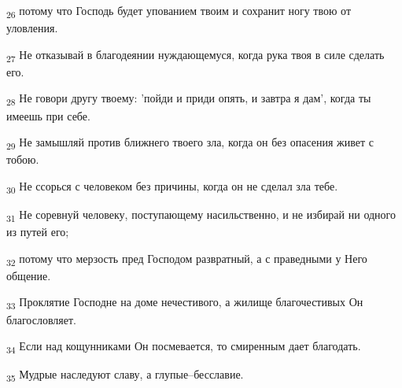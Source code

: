 \begin{tcolorbox}
\textsubscript{26} потому что Господь будет упованием твоим и сохранит ногу твою от уловления.
\end{tcolorbox}
\begin{tcolorbox}
\textsubscript{27} Не отказывай в благодеянии нуждающемуся, когда рука твоя в силе сделать его.
\end{tcolorbox}
\begin{tcolorbox}
\textsubscript{28} Не говори другу твоему: 'пойди и приди опять, и завтра я дам', когда ты имеешь при себе.
\end{tcolorbox}
\begin{tcolorbox}
\textsubscript{29} Не замышляй против ближнего твоего зла, когда он без опасения живет с тобою.
\end{tcolorbox}
\begin{tcolorbox}
\textsubscript{30} Не ссорься с человеком без причины, когда он не сделал зла тебе.
\end{tcolorbox}
\begin{tcolorbox}
\textsubscript{31} Не соревнуй человеку, поступающему насильственно, и не избирай ни одного из путей его;
\end{tcolorbox}
\begin{tcolorbox}
\textsubscript{32} потому что мерзость пред Господом развратный, а с праведными у Него общение.
\end{tcolorbox}
\begin{tcolorbox}
\textsubscript{33} Проклятие Господне на доме нечестивого, а жилище благочестивых Он благословляет.
\end{tcolorbox}
\begin{tcolorbox}
\textsubscript{34} Если над кощунниками Он посмевается, то смиренным дает благодать.
\end{tcolorbox}
\begin{tcolorbox}
\textsubscript{35} Мудрые наследуют славу, а глупые--бесславие.
\end{tcolorbox}

